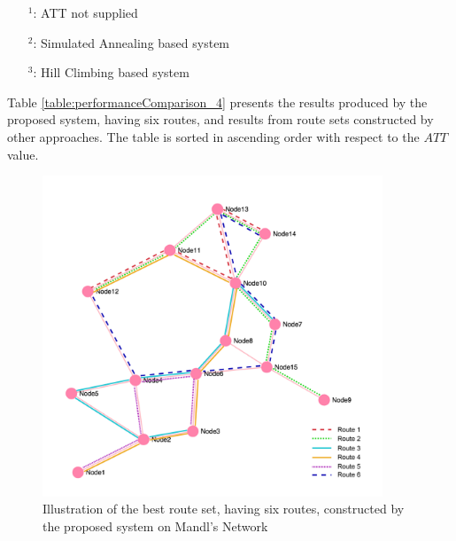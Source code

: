 \begin{table}[H]
    \begin{itemize}[noitemsep]
    \item[$^1$:] ATT not supplied
    \item[$^2$:] Simulated Annealing based system
    \item[$^3$:] Hill Climbing based system
    \end{itemize}
    \label{table:performanceComparison_4}
\end{table}

Table \vref{table:performanceComparison_4} presents the results produced by the proposed system, having six routes, and results from route sets constructed by other approaches. The table is sorted in ascending order with respect to the $ATT$ value.

\begin{figure}[H]
    \begin{center}
    \includegraphics[width=4in]{assets/mandlnetwork_6routes.png}
    \end{center}
    \caption{Illustration of the best route set, having six routes, constructed by the proposed system on Mandl's Network}
    \label{fig:bestRouteSet6} 
\end{figure}

